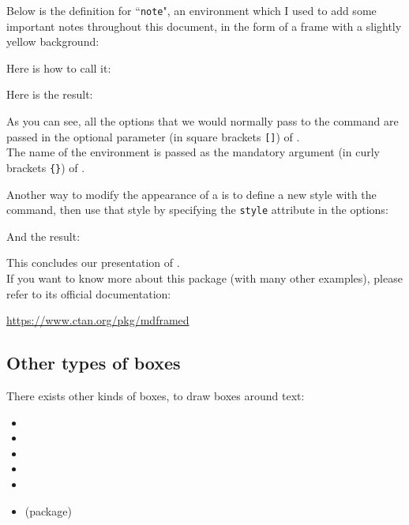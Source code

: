 Below is the definition for ``\texttt{note}", an environment which I used to add some important notes throughout this document, in the form of a frame with a slightly yellow background:


Here is how to call it:

Here is the result:



\bigskip

As you can see, all the options that we would normally pass to the  command are passed in the optional parameter (in square brackets \texttt{[]}) of . \\
The name of the environment is passed as the mandatory argument (in curly brackets \texttt{\{\}}) of .

\bigskip

Another way to modify the appearance of a  is to define a new style with the  command, then use that style by specifying the \texttt{style} attribute in the  options:


And the result:


\bigskip


This concludes our presentation of . \\

If you want to know more about this package (with many other examples), please refer to its official documentation: 
\begin{center}
\url{https://www.ctan.org/pkg/mdframed}
\end{center}


\newpage

\subsection{Other types of boxes}

There exists other kinds of boxes, to draw boxes around text:
\begin{itemize}
	\setlength{\itemsep}{-0.5em}
	
	\item {}
	\item {}
	\item {}
	\item {}
	\item {}
	\item {} (package)
\end{itemize}

